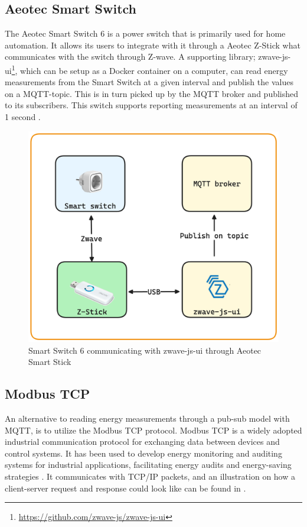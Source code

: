 \documentclass[
  table]{report}
\begin{document}
\subsection{Aeotec Smart Switch}

The Aeotec Smart Switch 6 is a power switch that is primarily used for
home automation. It allows its users to integrate with it through a
Aeotec Z-Stick what communicates with the switch through Z-wave. A
supporting library; zwave-js-ui\footnote{\url{https://github.com/zwave-js/zwave-js-ui}},
which can be setup as a Docker container on a computer, can read energy
measurements from the Smart Switch at a given interval and publish the
values on a \ac{MQTT}-topic. This is in turn picked up by the \ac{MQTT}
broker and published to its subscribers. This switch supports reporting
measurements at an interval of 1 second \citep{aeotecAeotecSmartSwitch}.

\begin{figure}[H]
\centering
  \includegraphics[width=0.7\columnwidth]{assets/3-smart-switch.png}
  \caption{Smart Switch 6 communicating with zwave-js-ui through Aeotec Smart Stick }
  \label{fig:modbus-tcp-gude}
\end{figure}

\subsection{Modbus TCP}
\label{sect:modbus_tcp}

An alternative to reading energy measurements through a pub-sub model
with \ac{MQTT}, is to utilize the Modbus TCP protocol. Modbus TCP is a
widely adopted industrial communication protocol for exchanging data
between devices and control systems. It has been used to develop energy
monitoring and auditing systems for industrial applications,
facilitating energy audits and energy-saving strategies
\citep{tongStudyEthernetCommunication2015}. It communicates with TCP/IP
packets, and an illustration on how a client-server request and response
could look like can be found in .
\end{document}

